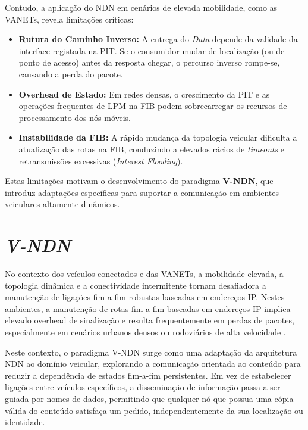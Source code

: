 Contudo, a aplicação do NDN em cenários de elevada mobilidade, como as \gls{VANETs}, revela limitações críticas:
\begin{itemize}
    \item \textbf{Rutura do Caminho Inverso:} A entrega do \textit{Data} depende da validade da interface registada na PIT. Se o consumidor mudar de localização (ou de ponto de acesso) antes da resposta chegar, o percurso inverso rompe-se, causando a perda do pacote.
    \item \textbf{Overhead de Estado:} Em redes densas, o crescimento da PIT e as operações frequentes de LPM na FIB podem sobrecarregar os recursos de processamento dos nós móveis.
    \item \textbf{Instabilidade da FIB:} A rápida mudança da topologia veicular dificulta a atualização das rotas na FIB, conduzindo a elevados rácios de \textit{timeouts} e retransmissões excessivas (\textit{Interest Flooding}).
\end{itemize}

Estas limitações motivam o desenvolvimento do paradigma \textbf{\gls{V-NDN}}, que introduz adaptações específicas para suportar a comunicação em ambientes veiculares altamente dinâmicos.

\section{\emph{\gls{V-NDN}}}
\label{sub:VNDN}
No contexto dos veículos conectados e das VANETs, a mobilidade elevada, a topologia dinâmica e a
conectividade intermitente tornam desafiadora a manutenção de ligações fim a fim robustas baseadas
em endereços IP. Nestes ambientes, a manutenção de rotas fim-a-fim baseadas em endereços IP implica elevado overhead de sinalização e resulta frequentemente em perdas de pacotes, especialmente em cenários urbanos densos ou rodoviários de alta velocidade \cite{rahman_data-centric_2021}.

Neste contexto, o paradigma \gls{V-NDN} surge como uma adaptação da arquitetura \gls{NDN} ao domínio veicular, explorando a comunicação orientada ao conteúdo para reduzir a dependência de estados fim-a-fim persistentes. Em vez de estabelecer ligações entre veículos específicos, a disseminação de informação passa a ser guiada por nomes de dados, permitindo que qualquer nó que possua uma cópia válida do conteúdo satisfaça um pedido, independentemente da sua localização ou identidade.

